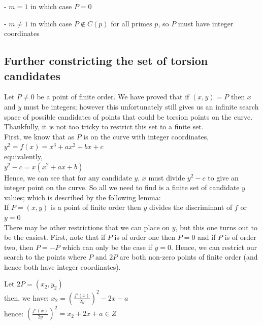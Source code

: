 \documentclass{article}
\begin{document}
- $m = 1$ in which case $P = 0$

- $m \neq 1$ in which case $P \notin C(p)$ for all primes $p$, so $P$ must have integer coordinates



\subsection{Further constricting the set of torsion candidates}

Let $P \neq 0$ be a point of finite order. We have proved that if $(x, y) = P$ then $x$ and $y$ must be integers; however this unfortunately still gives us an infinite search space of possible candidates of points that could be torsion points on the curve. Thankfully, it is not too tricky to restrict this set to a finite set.\\

First, we know that as $P$ is on the curve with integer coordinates, \\

$y^2 = f(x) = x^3 + a x^2 + b x + c$\\

equivalently,\\

$y^2 - c = x(x^2 + a x + b)$\\

Hence, we can see that for any candidate $y$, $x$ must divide $y^2 - c$ to give an integer point on the curve. So all we need to find is a finite set of candidate $y$ values; which is described by the following lemma:\\

If $P = (x, y)$ is a point of finite order then $y$ divides the discriminant of $f$ or $y = 0$\\

There may be other restrictions that we can place on $y$, but this one turns out to be the easiest. First, note that if $P$ is of order one then $P = 0$ and if $P$ is of order two, then $P = -P$ which can only be the case if $y = 0$. Hence, we can restrict our search to the points where $P$ and $2P$ are both non-zero points of finite order (and hence both have integer coordinates).

Let $2P = (x_2, y_2)$\\

then, we have: $x_2 = (\frac{f'(x)}{2y})^2 - 2x - a$\\

hence: $(\frac{f'(x)}{2y})^2 = x_2 + 2x + a \in Z$\\
\end{document}
